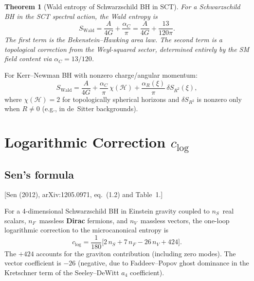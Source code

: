 \documentclass[12pt,a4paper]{article}
\newtheorem{theorem}[proposition]{Theorem}
\theoremstyle{definition}
\theoremstyle{remark}
\newcommand{\fromlit}[1]{\textcolor{blue!70!black}{\textsf{[#1]}}}
\begin{document}
\begin{theorem}[Wald entropy of Schwarzschild BH in SCT]
\label{thm:wald-schw}
For a Schwarzschild BH in the SCT spectral action, the Wald entropy is
\begin{equation}\label{eq:S-wald-full}
  \boxed{
  S_{\mathrm{Wald}} = \frac{A}{4G}
  + \frac{\alpha_C}{\pi}
  = \frac{A}{4G} + \frac{13}{120\pi}.}
\end{equation}
The first term is the Bekenstein--Hawking area law.  The second term is
a topological correction from the Weyl-squared sector,
determined entirely by the SM field content via $\alpha_C = 13/120$.
\end{theorem}

For Kerr--Newman BH with nonzero charge/angular momentum:
\begin{equation}
  S_{\mathrm{Wald}} = \frac{A}{4G}
  + \frac{\alpha_C}{\pi}\,\chi(\mathcal{H})
  + \frac{\alpha_R(\xi)}{\pi}\,\delta S_{R^2}(\xi),
\end{equation}
where $\chi(\mathcal{H}) = 2$ for topologically spherical horizons and
$\delta S_{R^2}$ is nonzero only when $R \neq 0$
(e.g., in de~Sitter backgrounds).


\section{Logarithmic Correction $c_{\log}$}
\label{sec:clog}

\subsection{Sen's formula}
\fromlit{Sen (2012), arXiv:1205.0971, eq.~(1.2) and Table~1.}

For a 4-dimensional Schwarzschild BH in Einstein gravity coupled to
$n_S$~real scalars, $n_F$~massless \textbf{Dirac} fermions, and
$n_V$~massless vectors, the one-loop logarithmic correction to the
microcanonical entropy is
\begin{equation}\label{eq:sen-formula}
  \boxed{
  c_{\log} = \frac{1}{180}\bigl[
    2\,n_S + 7\,n_F - 26\,n_V + 424
  \bigr].}
\end{equation}
The $+424$ accounts for the graviton contribution (including zero modes).
The vector coefficient is $-26$ (negative, due to Faddeev--Popov ghost
dominance in the Kretschner term of the Seeley--DeWitt $a_4$ coefficient).
\end{document}
